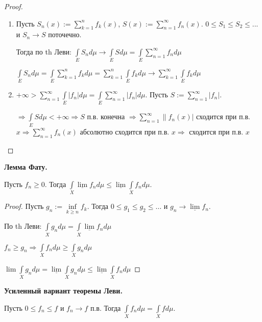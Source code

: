 \begin{proof}~
    \begin{enumerate}
        \item Пусть $S_n(x):=\sum\limits_{k=1}^n f_k(x)$, $S(x):=\sum\limits_{n=1}^\infty f_n(x)$. 
        $0\leq S_1\leq S_2 \leq ...$ и $S_n\rightarrow S$ поточечно.

        Тогда по th Леви: $\int\limits_E S_n d\mu\rightarrow \int\limits_E S d\mu = \int\limits_E \sum\limits_{n=1}^\infty f_n d\mu$

        $\int\limits_E S_n d\mu= \int\limits_E \sum\limits_{k=1}^n f_k d\mu=\sum\limits_{k=1}^n \int\limits_E f_k d\mu\rightarrow \sum\limits_{k=1}^\infty\int\limits_E f_k d\mu$

        \item $+\infty > \sum\limits_{n=1}^\infty\int\limits_E |f_n| d\mu = \int\limits_E \sum\limits_{n=1}^\infty |f_n| d\mu$. Пусть $S:=\sum\limits_{n=1}^\infty |f_n|$.
        
        $\Rightarrow \int\limits_E S d\mu<+\infty\Rightarrow S$ п.в. конечна $\Rightarrow \sum\limits_{n=1}^\infty\|f_n(x)|$ сходится при п.в. $x\Rightarrow
        \sum\limits_{n=1}^\infty f_n(x)$ абсолютно сходится при п.в. $x\Rightarrow$ сходится при п.в. $x$
    \end{enumerate}
\end{proof}

\begin{lemma}
    \textbf{Лемма Фату.}

    Пусть $f_n\geq 0$. Тогда $\int\limits_X \underline{\lim} f_n d\mu \leq \underline{\lim}\int\limits_X  f_n d\mu$.
\end{lemma}

\begin{proof}
    Пусть $g_n:= \underset{k\geq n}{\inf} f_k$. Тогда $0\leq g_1 \leq g_2 \leq \dots$ и $g_n \rightarrow \underline{\lim} f_n$.

    По th Леви: $\int\limits_X g_n d\mu = \int\limits_X \underline{\lim} f_n d\mu$

    $f_n\geq g_n \Rightarrow \int\limits_X f_n d\mu \geq \int\limits_X g_n d\mu$

    $\lim \int\limits_X g_n d\mu=\underline{\lim} \int\limits_X g_n d\mu\leq \underline{\lim} \int\limits_X f_n d\mu$
\end{proof}

\begin{corollary}
    \textbf{Усиленный вариант теоремы Леви.}

    Пусть $0\leq f_n \leq f$ и $f_n\rightarrow f$ п.в. Тогда $\int\limits_X f_n d\mu=\int\limits_X f d\mu$.
\end{corollary}

